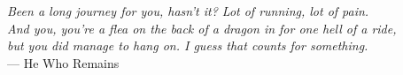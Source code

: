 \documentclass[../thesis.tex]{subfiles}
\begin{document}
\newpage
\null
\vfill

\begin{flushright}

	\textit{
		Been a long journey for you, hasn't it? Lot of running, lot of pain. \\
		And you, you're a flea on the back of a dragon in for one hell of a ride, \\
		but you did manage to hang on. I guess that counts for something.} \\
	--- He Who Remains

\end{flushright}

\begin{comment}

To be yourself in a world that is constantly trying to \\ make you something else is the greatest accomplishment. \\
--- Ralph Waldo Emerson

The reason anyone would do this, if they could, which they can't, \\
would be because they could, which they can't. \\
--- Pickle Rick

THE CIRCLE IS NOW COMPLETE.\\
--- Darth Vader

Neo: I know kung fu. \\
Morpheus: Show me.

\end{comment}

\vspace{4cm}

\thispagestyle{empty}
\end{document}
